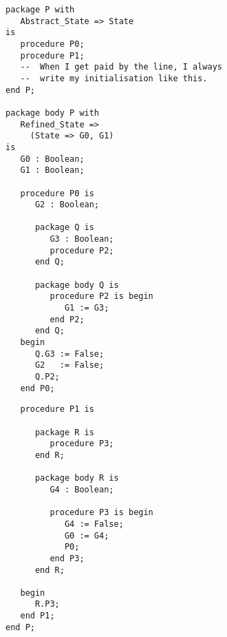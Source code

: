 \documentclass{article}
\begin{document}
\begin{multicols}{2}
\begin{lstlisting}
package P with
   Abstract_State => State
is
   procedure P0;
   procedure P1;
   --  When I get paid by the line, I always
   --  write my initialisation like this.
end P;

package body P with
   Refined_State =>
     (State => G0, G1)
is
   G0 : Boolean;
   G1 : Boolean;

   procedure P0 is
      G2 : Boolean;

      package Q is
         G3 : Boolean;
         procedure P2;
      end Q;

      package body Q is
         procedure P2 is begin
            G1 := G3;
         end P2;
      end Q;
   begin
      Q.G3 := False;
      G2   := False;
      Q.P2;
   end P0;
\end{lstlisting}
\vfill\columnbreak
\begin{lstlisting}
   procedure P1 is

      package R is
         procedure P3;
      end R;

      package body R is
         G4 : Boolean;

         procedure P3 is begin
            G4 := False;
            G0 := G4;
            P0;
         end P3;
      end R;

   begin
      R.P3;
   end P1;
end P;
\end{lstlisting}
\end{multicols}
\end{document}

